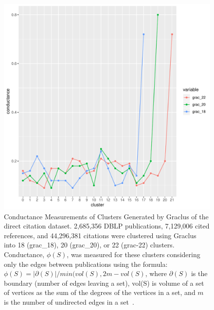 \newpage

\begin{figure}[ht]
\centering
  \includegraphics[scale=0.4]{graclus_comparison.pdf}
\caption{Conductance Measurements of Clusters Generated by Graclus of the direct citation dataset.  2,685,356 DBLP publications, 7,129,006 cited references, and 44,296,381 citations were clustered using Graclus into 18 (grac\_18), 20 (grac\_20), or 22 (grac-22) clusters. Conductance, $\phi(S)$, was measured for these clusters considering only the edges between publications using the formula: $\phi(S)=|\partial(S)|/min(vol(S),2m-vol(S)$, where $\partial(S)$ is the boundary (number of edges leaving a set), vol(S) is volume of a set of vertices as the sum of the degrees of the vertices in a set, and $m$ is the number of undirected edges in a set~\cite{shun_parallel_2016}.}
\label{fig:graclus_comparison_conductance}       
\end{figure}

\newpage

